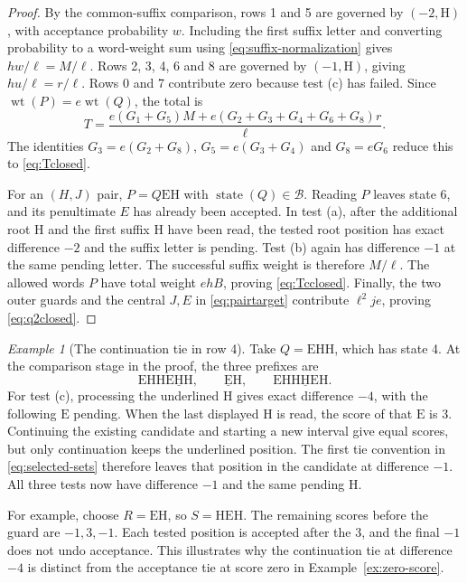 \documentclass[11pt,a4paper]{article}
\theoremstyle{definition}
\theoremstyle{remark}
\newtheorem{example}{Example}[section]
\newcommand{\wt}{\operatorname{wt}}
\newcommand{\E}{\mathrm E}
\newcommand{\HH}{\mathrm H}
\DeclareMathOperator{\state}{state}
\begin{document}
\begin{proof}
By the common-suffix comparison, rows 1 and 5 are governed by $(-2,\HH)$, with acceptance probability $w$. Including the first suffix letter and converting probability to a word-weight sum using \eqref{eq:suffix-normalization} gives $hw/\ell=M/\ell$. Rows 2, 3, 4, 6 and 8 are governed by $(-1,\HH)$, giving $hu/\ell=r/\ell$. Rows 0 and 7 contribute zero because test (c) has failed. Since $\wt(P)=e\wt(Q)$, the total is
\[
T=\frac{e(G_1+G_5)M+e(G_2+G_3+G_4+G_6+G_8)r}{\ell}.
\]
The identities $G_3=e(G_2+G_8)$, $G_5=e(G_3+G_4)$ and $G_8=eG_6$ reduce this to \eqref{eq:Tclosed}.

For an $(H,J)$ pair, $P=Q\E\HH$ with $\state(Q)\in\mathcal B$. Reading $P$ leaves state 6, and its penultimate $E$ has already been accepted. In test (a), after the additional root $\HH$ and the first suffix $\HH$ have been read, the tested root position has exact difference $-2$ and the suffix letter is pending. Test (b) again has difference $-1$ at the same pending letter. The successful suffix weight is therefore $M/\ell$. The allowed words $P$ have total weight $ehB$, proving \eqref{eq:Tcclosed}. Finally, the two outer guards and the central $J,E$ in \eqref{eq:pairtarget} contribute $\ell^2je$, proving \eqref{eq:q2closed}.
\end{proof}

\begin{example}[The continuation tie in row 4]\label{ex:continuation-tie}
Take $Q=\E\HH\HH$, which has state 4. At the comparison stage in the proof, the three prefixes are
\[
\E\HH\HH\E\underline{\HH}\HH,\qquad
\underline{\E}\HH,\qquad
\E\HH\HH\underline{\HH}\E\HH.
\]
For test (c), processing the underlined $\HH$ gives exact difference $-4$, with the following $\E$ pending. When the last displayed $\HH$ is read, the score of that $\E$ is $3$. Continuing the existing candidate and starting a new interval give equal scores, but only continuation keeps the underlined position. The first tie convention in \eqref{eq:selected-sets} therefore leaves that position in the candidate at difference $-1$. All three tests now have difference $-1$ and the same pending $\HH$.

For example, choose $R=\E\HH$, so $S=\HH\E\HH$. The remaining scores before the guard are $-1,3,-1$. Each tested position is accepted after the $3$, and the final $-1$ does not undo acceptance. This illustrates why the continuation tie at difference $-4$ is distinct from the acceptance tie at score zero in Example~\ref{ex:zero-score}.
\end{example}
\end{document}
